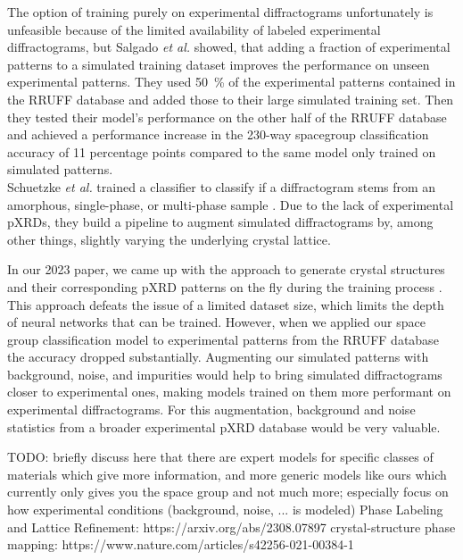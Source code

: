 The option of training purely on experimental diffractograms unfortunately is unfeasible because of the limited availability of labeled experimental diffractograms, but Salgado {\it et al.} \cite{Salgado2023} showed, that adding a fraction of experimental patterns to a simulated training dataset improves the performance on unseen experimental patterns. They used \SI{50}{\percent} of the experimental patterns contained in the RRUFF database and added those to their large simulated training set. Then they tested their model's performance on the other half of the RRUFF database and achieved a performance increase in the 230-way spacegroup classification accuracy of \num{11} percentage points compared to the same model only trained on simulated patterns. \\

Schuetzke {\it et al.} trained a classifier to classify if a diffractogram stems from an amorphous, single-phase, or multi-phase sample \cite{Schuetzke2024}. Due to the lack of experimental pXRDs, they build a pipeline to augment simulated diffractograms by, among other things, slightly varying the underlying crystal lattice.

In our 2023 paper, we came up with the approach to generate crystal structures and their corresponding pXRD patterns on the fly during the training process \cite{Schopmans2023}. This approach defeats the issue of
a limited dataset size, which limits the depth of neural networks that can be trained. However, when we applied our space group classification model to experimental patterns from the RRUFF database the accuracy dropped substantially. Augmenting our simulated patterns with background, noise, and impurities would help to bring simulated diffractograms closer to experimental ones, making models trained on them more performant on experimental diffractograms. For this augmentation, background and noise statistics from a broader experimental pXRD database would be very valuable.



TODO: briefly discuss here that there are expert models for specific classes of materials which give more information, and more generic models like ours which currently only gives you the space group and not much more; especially focus on how experimental conditions (background, noise, ... is modeled)
Phase Labeling and Lattice Refinement: https://arxiv.org/abs/2308.07897
crystal-structure phase mapping: https://www.nature.com/articles/s42256-021-00384-1



